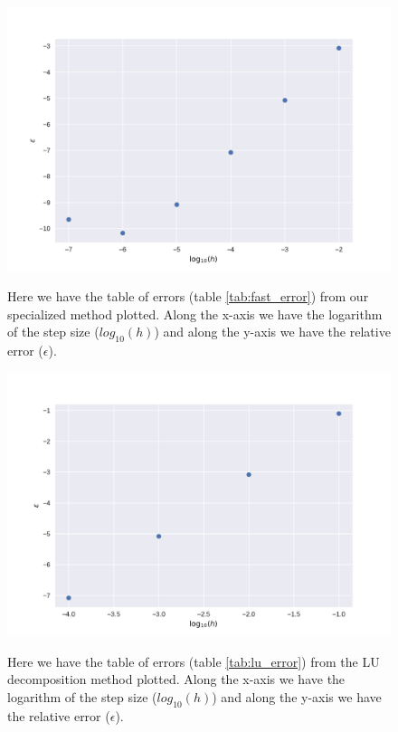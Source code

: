 \documentclass[reprint, english,notitlepage]{revtex4-1}  %
\begin{document}
\begin{figure}[h]
	\centering
	\includegraphics[scale=0.5]{../output/fast_errors.pdf}
	\label{fig:fast_error}
	\caption{Here we have the table of errors (table \ref{tab:fast_error}) from our specialized method plotted. Along the x-axis we have the logarithm of the step size ($log_{10}(h)$) and along the y-axis we have the relative error ($\epsilon$).} 
\end{figure}

\begin{figure}[h]
	\centering
	\includegraphics[scale=0.5]{../output/lu_errors.pdf}
	\label{fig:lu_error}
	\caption{Here we have the table of errors (table \ref{tab:lu_error}) from the LU decomposition method plotted. Along the x-axis we have the logarithm of the step size ($log_{10}(h)$) and along the y-axis we have the relative error ($\epsilon$).} 
\end{figure}
\end{document}
